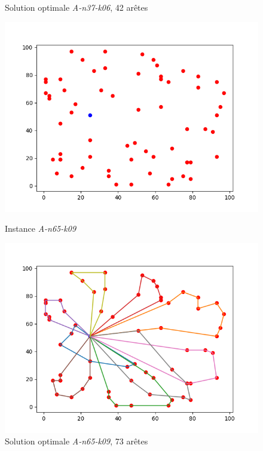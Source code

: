 \documentclass[a4paper,11pt]{article}%
\begin{document}
\begin{figure}[h!]
\begin{minipage}[c]{.46\linewidth}
        \caption{Solution optimale \emph{A-n37-k06}, 42 arêtes}
        \label{SolA3706}
    \end{minipage}
    
    \begin{minipage}[c]{.46\linewidth}
        \centering
        \includegraphics[scale=0.4]{Instance6509}
        
        \caption{Instance \emph{A-n65-k09}}
        \label{A6509}
    \end{minipage}
    \hfill%
    \begin{minipage}[c]{.46\linewidth}
        \centering
        \includegraphics[scale=0.4]{Solution6509}
        
        \caption{Solution optimale \emph{A-n65-k09}, 73 arêtes}
        \label{SolA6509}
    \end{minipage}    
    

\end{figure}
\end{document}
